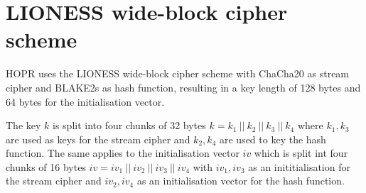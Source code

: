 \section{LIONESS wide-block cipher scheme}
\label{appendix:lioness}

HOPR uses the LIONESS \cite{lionesspaper} wide-block cipher scheme with ChaCha20 as stream cipher and BLAKE2s as hash function, resulting in a key length of 128 bytes and 64 bytes for the initialisation vector.

The key $k$ is split into four chunks of 32 bytes $k = k_1 \ || \ k_2 \ || \  k_3 \ || \ k_4$ where $k_1, k_3$ are used as keys for the stream cipher and $k_2, k_4$ are used to key the hash function. The same applies to the initialisation vector $iv$ which is split int four chunks of 16 bytes $iv = iv_1 \ || \ iv_2 \ || \  iv_3 \ || \ iv_4$ with $iv_1, iv_3$ as an inititialisation for the stream cipher and $iv_2, iv_4$ as an initialisation vector for the hash function.

